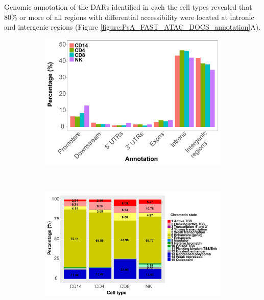 
  
Genomic annotation of the DARs identified in each the cell types revealed that 80\% or more of all regions with differential accessibility were located at intronic and intergenic regions (Figure \ref{figure:PsA_FAST_ATAC_DOCS_annotation}A). 

\bigskip
\begin{figure}[htbp]
\centering
\begin{subfigure}[b]{0.7\textwidth}
\centering 
\includegraphics[width=\textwidth]{./Results3/pdfs/ATAC_PSA_DOCS_per_cell_type_general_annotation}
\caption{}
\end{subfigure}
~
\begin{subfigure}[b]{0.75\textwidth} 
\centering
\includegraphics[width=\textwidth]{./Results3/pdfs/ATAC_PSA_DOCS_chromatin_states_stacked_barplot}

\end{subfigure}
\end{figure}
